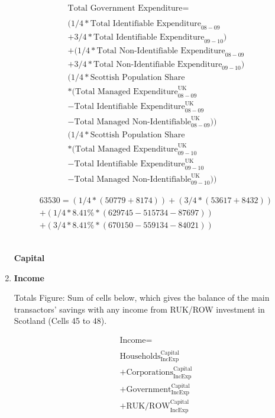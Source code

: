 \begin{enumerate}
\begin{equation}
\begin{split}
\text{Total Government Expenditure} =  \\ \\
(1/4 * \text{Total Identifiable Expenditure}_{08-09} \\
+ 3/4 * \text{Total Identifiable Expenditure}_{09-10})\\
+ (1/4 * \text{Total Non-Identifiable Expenditure}_{08-09} \\
+ 3/4 * \text{Total Non-Identifiable Expenditure}_{09-10}) \\
( 1/4 * \text{Scottish Population Share}\\
* ( \text{Total Managed Expenditure}^\text{UK}_{08-09} \\
- \text{Total Identifiable Expenditure}^\text{UK}_{08-09} \\
- \text{Total Managed Non-Identifiable}^\text{UK}_{08-09})) \\
( 1/4 * \text{Scottish Population Share}\\
* ( \text{Total Managed Expenditure}^\text{UK}_{09-10} \\
- \text{Total Identifiable Expenditure}^\text{UK}_{09-10} \\
- \text{Total Managed Non-Identifiable}^\text{UK}_{09-10}))
\end{split} \label{eq:2.5.47}
\end{equation}


\begin{equation} \nonumber
\begin{split}
63530 = (1/4*(50779+8174))+(3/4*(53617+8432))\\
+(1/4*8.41\%*(629745-515734-87697))\\
+(3/4*8.41\%*(670150-559134-84021))
\end{split}
\end{equation}\\


\pagebreak


\begin{center}
\textbf{\LARGE Capital}
\end{center}

\item \textbf {Income}

Totals Figure: Sum of cells below, which gives the balance of the main transactors' savings with any income from RUK/ROW investment in Scotland (Cells 45 to 48).

\begin{equation}
\begin{split}
\text{Income} =  \\ \\
\text{Households}^\text{Capital}_\text{IncExp}\\
+\text{Corporations}^\text{Capital}_\text{IncExp}\\
+\text{Government}^\text{Capital}_\text{IncExp}\\
+\text{RUK/ROW}^\text{Capital}_\text{IncExp}
\end{split} \label{eq:2.5.48}
\end{equation}


\end{enumerate}
